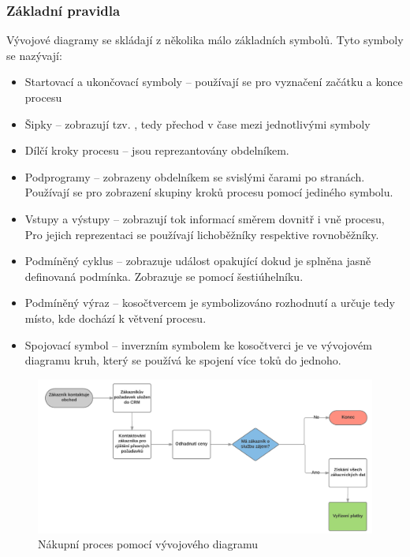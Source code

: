 \documentclass[]{article}
\begin{document}
\subsubsection{Základní pravidla}
Vývojové diagramy se skládají z několika málo základních symbolů. Tyto symboly se nazývají: \cite{Chytil2005}

\begin{itemize}
\item Startovací a ukončovací symboly – používají se pro vyznačení začátku a konce procesu
\item Šipky – zobrazují tzv. , tedy přechod v čase mezi jednotlivými symboly
\item Dílčí kroky procesu – jsou reprezantovány obdelníkem.
\item Podprogramy – zobrazeny obdelníkem se svislými čarami po stranách. Používají se pro zobrazení skupiny kroků procesu pomocí jediného symbolu.
\item Vstupy a výstupy – zobrazují tok informací směrem dovnitř i vně procesu, Pro jejich reprezentaci se používají lichoběžníky respektive rovnoběžníky.
\item Podmíněný cyklus – zobrazuje událost opakující dokud je splněna jasně definovaná podmínka. Zobrazuje se pomocí šestiúhelníku.
\item Podmíněný výraz – kosočtvercem je symbolizováno rozhodnutí a určuje tedy místo, kde dochází k větvení procesu.
\item Spojovací symbol – inverzním symbolem ke kosočtverci je ve vývojovém diagramu kruh, který se používá ke spojení více toků do jednoho.
\end{itemize}

\begin{figure}[H]\centering %
\includegraphics[width=1.0\textwidth]{obrazky/flowchart}
\caption{Nákupní proces pomocí vývojového diagramu}
\label{fig:Flowchart}
\end{figure}
\end{document}
